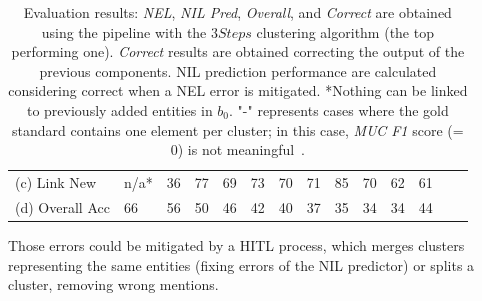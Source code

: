 \begin{table}
\begin{tabular}{llrrrrrrrrrrrr}
(c) Link New & n/a* & 36 & 77 & 69 & 73 & 70 & 71 & 85 & 70 & 62 & 61 & \\ 
(d) Overall Acc & 66 & 56 & 50 & 46 & 42 & 40 & 37 & 35 & 34 & 34 & 44 & \\ 
\bottomrule
\end{tabular}
    \caption{Evaluation results: \textit{NEL}, \textit{NIL Pred}, \textit{Overall}, and \textit{Correct} are obtained using the pipeline with the $3Steps$ clustering algorithm (the top performing one). \textit{Correct} results are obtained correcting the output of the previous components. NIL prediction performance are calculated considering correct when a NEL error is mitigated. *Nothing can be linked to previously added entities in $b_{0}$. "-" represents cases where the gold standard contains one element per cluster; in this case, \textit{MUC F1} score (= 0) is not meaningful~\cite{recasens_hovy_2011}.}
    \label{tab:superresults}
\end{table}

Those errors could be mitigated by a HITL process, which merges clusters representing the same entities (fixing errors of the NIL predictor) or splits a cluster, removing wrong mentions.


